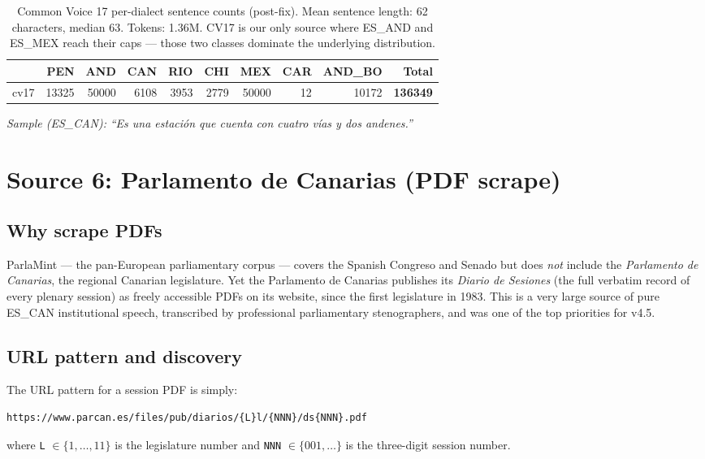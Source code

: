 \documentclass[11pt,a4paper]{article}
\begin{document}
\begin{table}[h]
\centering
\begin{tabular}{l r r r r r r r r r}
\toprule
 & \textbf{PEN} & \textbf{AND} & \textbf{CAN} & \textbf{RIO} & \textbf{CHI} & \textbf{MEX} & \textbf{CAR} & \textbf{AND\_BO} & \textbf{Total} \\
\midrule
cv17 & \num{13325} & \num{50000} & \num{6108} & \num{3953} & \num{2779} & \num{50000} & \num{12} & \num{10172} & \textbf{\num{136349}} \\
\bottomrule
\end{tabular}
\caption{Common Voice 17 per-dialect sentence counts (post-fix). Mean
sentence length: 62 characters, median 63. Tokens: 1.36M. CV17 is our
only source where ES\_AND and ES\_MEX reach their caps --- those two
classes dominate the underlying distribution.}
\label{tab:cv17-stats}
\end{table}

\emph{Sample (ES\_CAN):} \emph{``Es una estación que cuenta con cuatro
vías y dos andenes.''}

\section{Source 6: Parlamento de Canarias (PDF scrape)}

\subsection{Why scrape PDFs}

ParlaMint --- the pan-European parliamentary corpus --- covers the Spanish
Congreso and Senado but does \emph{not} include the \emph{Parlamento de
Canarias}, the regional Canarian legislature. Yet the Parlamento de
Canarias publishes its \emph{Diario de Sesiones} (the full verbatim
record of every plenary session) as freely accessible PDFs on its
website, since the first legislature in 1983. This is a very large
source of pure ES\_CAN institutional speech, transcribed by professional
parliamentary stenographers, and was one of the top priorities for
v4.5.

\subsection{URL pattern and discovery}

The URL pattern for a session PDF is simply:
\begin{lstlisting}[style=shellcode]
https://www.parcan.es/files/pub/diarios/{L}l/{NNN}/ds{NNN}.pdf
\end{lstlisting}
where \texttt{L} $\in \{1,\ldots,11\}$ is the legislature number and
\texttt{NNN} $\in \{001,\ldots\}$ is the three-digit session number.
\end{document}
